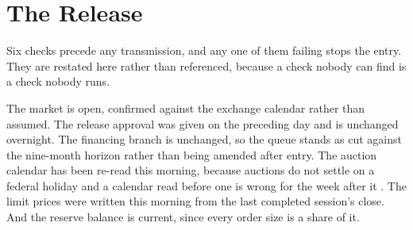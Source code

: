 \section{The Release}

Six checks precede any transmission, and any one of them failing stops the entry.
They are restated here rather than referenced, because a check nobody can find is
a check nobody runs.

The market is open, confirmed against the exchange calendar rather than assumed.
The release approval was given on the preceding day and is unchanged overnight.
The financing branch is unchanged, so the queue stands as cut against the
nine-month horizon rather than being amended after entry. The auction calendar
has been re-read this morning, because auctions do not settle on a federal
holiday and a calendar read before one is wrong for the week after it
\cite{treasuryauctions2026}. The limit prices were written this morning from the
last completed session's close. And the reserve balance is current, since every
order size is a share of it.

